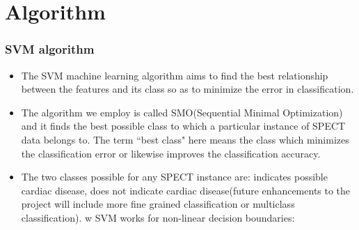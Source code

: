 \documentclass[11pt,xcolor=dvipsnames]{beamer}
\begin{document}

\section{Algorithm}	
\begin{frame}
\frametitle{SVM algorithm}	
\begin{itemize}
\item The SVM machine learning algorithm aims to find the best relationship between the features and its class so as to minimize the error in classification.\\ 
\item The algorithm we employ is called {\color{PineGreen}SMO(Sequential Minimal Optimization)} and it finds the best possible class to which a particular instance of SPECT data belongs to. The term ``best class" here means the class which minimizes the classification error or likewise improves the classification accuracy.\\
\item The two classes possible for any SPECT instance are: indicates possible cardiac disease, does not indicate cardiac disease(future enhancements to the project will include more fine grained classification or multiclass classification).
w SVM works for non-linear decision boundaries:\\
\end{itemize}
\end{frame}
\end{document}
